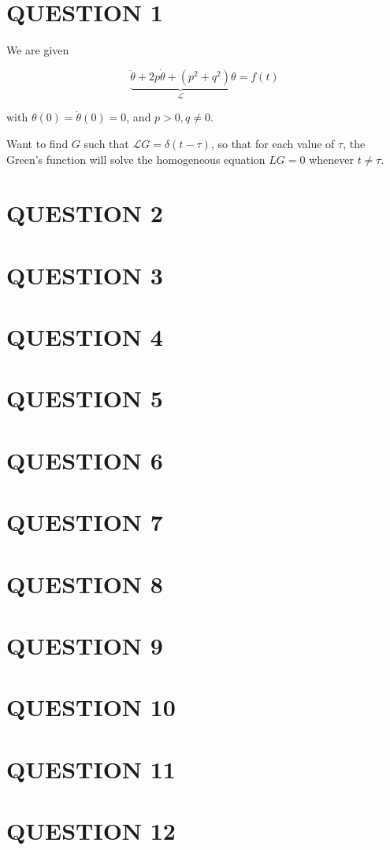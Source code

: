 \documentclass[a4paper]{article}
\begin{document}
	
\maketitle

\section{QUESTION 1}

We are given

\[ \underbrace{\ddot{\theta} + 2p \dot{\theta} + (p^{2} + q^{2})}_{\mathcal{L}}\theta = f(t) \]

with $ \theta(0) = \dot{\theta}(0) = 0 $, and $ p > 0, q \neq 0 $.

Want to find $ G $ such that $ \mathcal{L} G = \delta(t - \tau) $, so that for each value of $ \tau $, the Green's function will solve the homogeneous equation $ LG = 0 $ whenever $ t \neq \tau $.

 

\section{QUESTION 2}
\section{QUESTION 3}
\section{QUESTION 4}
\section{QUESTION 5}
\section{QUESTION 6}
\section{QUESTION 7}
\section{QUESTION 8}
\section{QUESTION 9}
\section{QUESTION 10}
\section{QUESTION 11}
\section{QUESTION 12}
\end{document}
